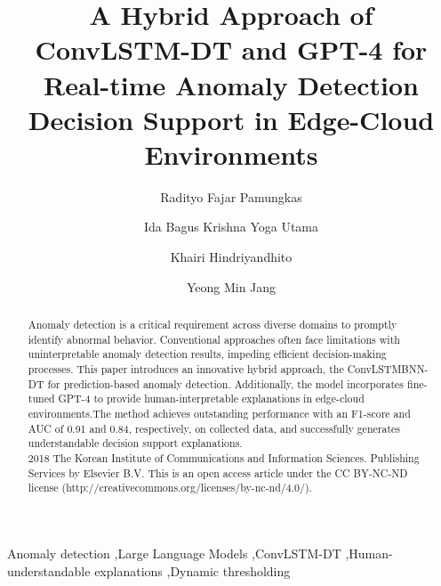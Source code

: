\documentclass[final,3p,times,twocolumn]{elsarticle}
\begin{document}
\begin{frontmatter}

\title{A Hybrid Approach of ConvLSTM-DT and GPT-4 for Real-time Anomaly Detection Decision Support in Edge-Cloud Environments}
\author{Radityo Fajar Pamungkas}

\author{Ida Bagus Krishna Yoga Utama}

\author{Khairi Hindriyandhito}

\author{Yeong Min Jang}
\address{Department of Electronics Engineering, Kookmin University, Seoul, South Korea}


\begin{abstract}

Anomaly detection is a critical requirement across diverse domains to promptly identify abnormal behavior. Conventional approaches often face limitations with uninterpretable anomaly detection results, impeding efficient decision-making processes. This paper introduces an innovative hybrid approach, the ConvLSTMBNN-DT for prediction-based anomaly detection. Additionally, the model incorporates fine-tuned GPT-4 to provide human-interpretable explanations in edge-cloud environments.The method achieves outstanding performance with an F1-score and AUC of 0.91 and 0.84, respectively, on collected data, and successfully generates understandable decision support explanations.
\\
2018 The Korean Institute of Communications and Information Sciences. Publishing Services by Elsevier B.V. This is an open access article under the CC BY-NC-ND license (http://creativecommons.org/licenses/by-nc-nd/4.0/).
\end{abstract}

\begin{keyword}
Anomaly detection \sep Large Language Models \sep ConvLSTM-DT \sep Human-understandable explanations \sep Dynamic thresholding
\end{keyword}

\end{frontmatter}
\end{document}
